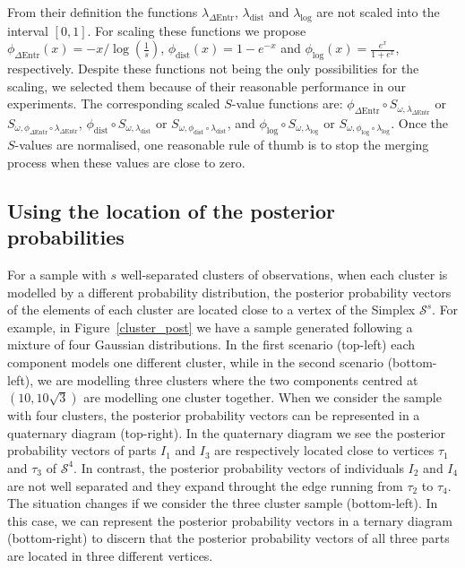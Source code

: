\documentclass[submit]{smj}
\theoremstyle{definition}
\begin{document}
From their definition the functions $\lambda_{\Delta\text{Entr}}$, $\lambda_{\text{dist}}$ and 
$\lambda_{\log}$ are not scaled into the interval $\left[0,1\right]$. For scaling these functions we propose  $\phi_{\Delta\text{Entr}}(x) = -x/{\log(\frac{1}{s})}$, $\phi_{\text{dist}}(x) = 1-e^{-x}$ and $\phi_{\log}(x) = \frac{e^x}{1+e^x}$, respectively. Despite these functions not being the only possibilities for the scaling, we selected them because of their reasonable performance in our experiments. The corresponding scaled $S$-value functions are: 
  $\phi_{\Delta\text{Entr}} \circ S_{\omega, \lambda_{\Delta\text{Entr}}}$ or $S_{\omega, \phi_{\Delta\text{Entr}} \circ \lambda_{\Delta\text{Entr}}}$, $\phi_{\text{dist}} \circ S_{\omega, \lambda_{\text{dist}}}$ or $S_{\omega, \phi_{\text{dist}} \circ \lambda_{\text{dist}}}$, and $\phi_{\log} \circ S_{\omega, \lambda_{\log}}$ or $S_{\omega, \phi_{\log} \circ \lambda_{\log}}$. Once the $S$-values are normalised, one reasonable rule of thumb is to stop the merging process when these values are close to zero.

\subsection{Using the location of the posterior probabilities}\label{coda_clusters}

For a sample with $s$ well-separated clusters of observations, when each cluster is modelled by a different probability distribution, the posterior probability vectors of the elements of each cluster are located close to a vertex of the Simplex $\mathcal{S}^s$. For example, in Figure~\ref{cluster_post} we have a sample generated following a mixture of four Gaussian distributions. In the first scenario (top-left) each component models one different cluster, while in the second scenario (bottom-left), we are modelling three clusters where the two components centred at $(10, 10 \sqrt{3})$ are modelling one cluster together. When we consider the sample with four clusters, the posterior probability vectors can be represented in a quaternary diagram (top-right). In the quaternary diagram we see the posterior probability vectors of parts $I_1$ and $I_3$ are respectively located close to vertices $\tau_1$ and $\tau_3$ of $\mathcal{S}^4$. In contrast, the posterior probability vectors of individuals $I_2$ and $I_4$ are not well separated and they expand throught the edge running from $\tau_2$ to $\tau_4$. The situation changes if we consider the three cluster sample (bottom-left). In this case, we can represent the posterior probability vectors in a ternary diagram (bottom-right) to discern that the posterior probability vectors of all three parts are located in three different vertices.
\end{document}
